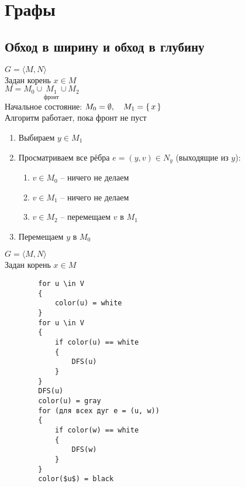 \chapter{Графы}

\section{Обход в ширину и обход в глубину}

\begin{algorithm}
	$ G = \langle M, N \rangle $ \\
    Задан корень $ x \in M $ \\
    $ M = M_0 \cup \underset{\text{фронт}}{M_1} \cup M_2 $ \\
    Начальное состояние: $ M_0 = \emptyset, \quad M_1 = \set{x} $ \\
    Алгоритм работает, пока фронт не пуст
    \begin{enumerate}
    	\item Выбираем $ y \in M_1 $
        \item Просматриваем все рёбра $ e = (y, v) \in N_y $ (выходящие из $y$):
        \begin{enumerate}
            \item $ v \in M_0 $ -- ничего не делаем
            \item $ v \in M_1 $ -- ничего не делаем
            \item $ v \in M_2 $ -- перемещаем $ v $ в $M_1$
        \end{enumerate}
        \item Перемещаем $y$ в $M_0$
    \end{enumerate}
\end{algorithm}

\begin{algorithm}
	$ G = \langle M, N \rangle $ \\
    Задан корень $ x \in M $
    \begin{verbatim}
        for u \in V
        {
            color(u) = white
        }
        for u \in V
        {
            if color(u) == white
            {
                DFS(u)
            }
        }
        DFS(u)
        color(u) = gray
        for (для всех дуг e = (u, w))
        {
            if color(w) == white
            {
                DFS(w)
            }
        }
        color($u$) = black
    \end{verbatim}
\end{algorithm}

